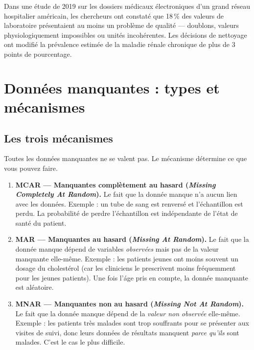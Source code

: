 \begin{clinicalnote}
Dans une \'etude de 2019 sur les dossiers m\'edicaux \'electroniques d'un grand r\'eseau hospitalier am\'ericain, les chercheurs ont constat\'e que 18\,\% des valeurs de laboratoire pr\'esentaient au moins un probl\`eme de qualit\'e --- doublons, valeurs physiologiquement impossibles ou unit\'es incoh\'erentes. Les d\'ecisions de nettoyage ont modifi\'e la pr\'evalence estim\'ee de la maladie r\'enale chronique de plus de 3 points de pourcentage.
\end{clinicalnote}

\section{Donn\'ees manquantes : types et m\'ecanismes}

\subsection{Les trois m\'ecanismes}

Toutes les donn\'ees manquantes ne se valent pas. Le m\'ecanisme d\'etermine ce que vous pouvez faire.

\begin{enumerate}
  \item \textbf{MCAR --- Manquantes compl\`etement au hasard (\emph{Missing Completely At Random}).} Le fait que la donn\'ee manque n'a aucun lien avec les donn\'ees. Exemple : un tube de sang est renvers\'e et l'\'echantillon est perdu. La probabilit\'e de perdre l'\'echantillon est ind\'ependante de l'\'etat de sant\'e du patient.
  \item \textbf{MAR --- Manquantes au hasard (\emph{Missing At Random}).} Le fait que la donn\'ee manque d\'epend de variables \emph{observ\'ees} mais pas de la valeur manquante elle-m\^eme. Exemple : les patients jeunes ont moins souvent un dosage du cholest\'erol (car les cliniciens le prescrivent moins fr\'equemment pour les jeunes patients). Une fois l'\'age pris en compte, la donn\'ee manquante est al\'eatoire.
  \item \textbf{MNAR --- Manquantes non au hasard (\emph{Missing Not At Random}).} Le fait que la donn\'ee manque d\'epend de la \emph{valeur non observ\'ee} elle-m\^eme. Exemple : les patients tr\`es malades sont trop souffrants pour se pr\'esenter aux visites de suivi, donc leurs donn\'ees de r\'esultats manquent \emph{parce qu'ils} sont malades. C'est le cas le plus difficile.
\end{enumerate}

